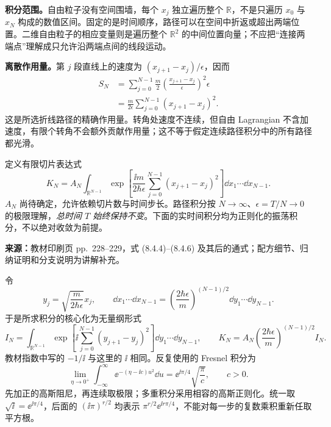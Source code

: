 \textbf{积分范围。}自由粒子没有空间围墙，每个 $x_j$ 独立遍历整个 $\mathbb R$，不是只遍历 $x_0$ 与 $x_N$ 构成的数值区间。固定的是时间顺序，路径可以在空间中折返或超出两端位置。二维自由粒子的相应变量则是遍历整个 $\mathbb R^2$ 的中间位置向量；不应把“连接两端点”理解成只允许沿两端点间的线段运动。

\textbf{离散作用量。}第 $j$ 段直线上的速度为 $(x_{j+1}-x_j)/\epsilon$，因而
\begin{align}
  S_N&=\sum_{j=0}^{N-1}\frac m2
     \left(\frac{x_{j+1}-x_j}{\epsilon}\right)^2\epsilon\\
  &=\frac{m}{2\epsilon}\sum_{j=0}^{N-1}(x_{j+1}-x_j)^2.
  \label{eq:QM-C08-S04-discrete-action}
\end{align}
这是所选折线路径的精确作用量。转角处速度不连续，但自由 Lagrangian 不含加速度，有限个转角不会额外贡献作用量；这不等于假定连续路径积分中的所有路径都光滑。

定义有限切片表达式
\begin{equation}
  K_N=A_N\int_{\mathbb R^{N-1}}
    \exp\!\left[\frac{\ii m}{2\hbar\epsilon}
      \sum_{j=0}^{N-1}(x_{j+1}-x_j)^2\right]
    \dd x_1\cdots\dd x_{N-1}.
  \label{eq:QM-C08-S04-sliced-kernel}
\end{equation}
$A_N$ 尚待确定，允许依赖切片数与时间步长。路径积分按 $N\to\infty$、$\epsilon=T/N\to0$ 的极限理解，\emph{总时间 $T$ 始终保持不变}。下面的实时间积分均为正则化的振荡积分，不以绝对收敛为前提。

\textbf{来源：}教材印刷页 pp.~228--229，式 (8.4.4)--(8.4.6) 及其后的通式；配方细节、归纳证明和分支说明为讲解补充。

令
\begin{equation}
  y_j=\sqrt{\frac{m}{2\hbar\epsilon}}x_j,\qquad
  \dd x_1\cdots\dd x_{N-1}
  =\left(\frac{2\hbar\epsilon}{m}\right)^{(N-1)/2}
    \dd y_1\cdots\dd y_{N-1}.
\end{equation}
于是所求积分的核心化为无量纲形式
\begin{equation}
  I_N=\int_{\mathbb R^{N-1}}
    \exp\!\left[\ii\sum_{j=0}^{N-1}(y_{j+1}-y_j)^2\right]
    \dd y_1\cdots\dd y_{N-1},\qquad
  K_N=A_N\left(\frac{2\hbar\epsilon}{m}\right)^{(N-1)/2}I_N.
\end{equation}
教材指数中写的 $-1/\ii$ 与这里的 $\ii$ 相同。反复使用的 Fresnel 积分为
\begin{equation}
  \lim_{\eta\to0^+}\int_{-\infty}^{\infty}
  \ee^{-(\eta-\ii c)u^2}\dd u
  =\ee^{\ii\pi/4}\sqrt{\frac\pi c},\qquad c>0.
  \label{eq:QM-C08-S04-fresnel}
\end{equation}
先加正的高斯阻尼，再连续取极限；多重积分采用相容的高斯正则化。统一取 $\sqrt{\ii}=\ee^{\ii\pi/4}$，后面的 $(\ii\pi)^{r/2}$ 均表示 $\pi^{r/2}\ee^{\ii r\pi/4}$，不能对每一步的复数乘积重新任取平方根。


